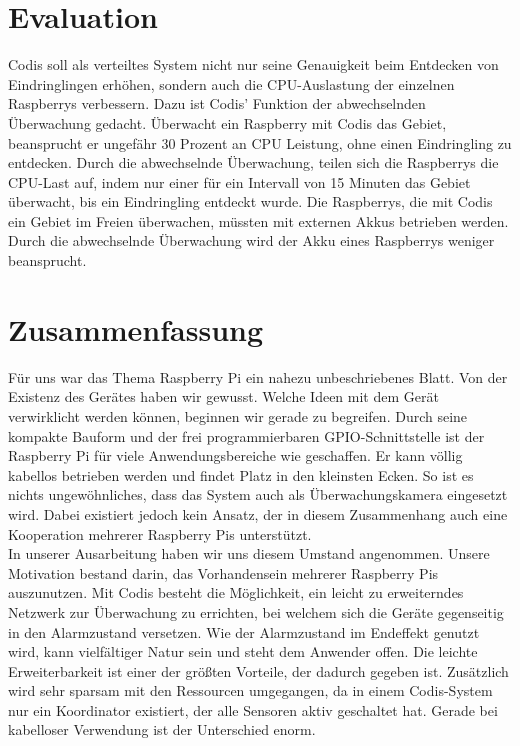 \documentclass[journal]{IEEEtran}
\begin{document}
\section{Evaluation}

Codis soll als verteiltes System nicht nur seine Genauigkeit beim Entdecken von Eindringlingen erhöhen, sondern auch die CPU-Auslastung der einzelnen Raspberrys verbessern. Dazu ist Codis' Funktion der abwechselnden Überwachung gedacht. Überwacht ein Raspberry mit Codis das Gebiet, beansprucht er ungefähr 30 Prozent an CPU Leistung, ohne einen Eindringling zu entdecken. Durch die abwechselnde Überwachung, teilen sich die Raspberrys die CPU-Last auf, indem nur einer für ein Intervall von 15 Minuten das Gebiet überwacht, bis ein Eindringling entdeckt wurde. Die Raspberrys, die mit Codis ein Gebiet im Freien überwachen, müssten mit externen Akkus betrieben werden. Durch die abwechselnde Überwachung wird der Akku eines Raspberrys weniger beansprucht.

\section{Zusammenfassung}
Für uns war das Thema Raspberry Pi ein nahezu unbeschriebenes Blatt. Von der Existenz des Gerätes haben wir gewusst. Welche Ideen mit dem Gerät verwirklicht werden können, beginnen wir gerade zu begreifen. Durch seine kompakte Bauform und der frei programmierbaren GPIO-Schnittstelle ist der Raspberry Pi für viele Anwendungsbereiche wie geschaffen. Er kann völlig kabellos betrieben werden und findet Platz in den kleinsten Ecken. So ist es nichts ungewöhnliches, dass das System auch als Überwachungskamera eingesetzt wird. Dabei existiert jedoch kein Ansatz, der in diesem Zusammenhang auch eine Kooperation mehrerer Raspberry Pis unterstützt. \\In unserer Ausarbeitung haben wir uns diesem Umstand angenommen. Unsere Motivation bestand darin, das Vorhandensein mehrerer Raspberry Pis auszunutzen. Mit Codis besteht die Möglichkeit, ein leicht zu erweiterndes Netzwerk zur Überwachung zu errichten, bei welchem sich die Geräte gegenseitig in den Alarmzustand versetzen. Wie der Alarmzustand im Endeffekt genutzt wird, kann vielfältiger Natur sein und steht dem Anwender offen. Die leichte Erweiterbarkeit ist einer der größten Vorteile, der dadurch gegeben ist. Zusätzlich wird sehr sparsam mit den Ressourcen umgegangen, da in einem Codis-System nur ein Koordinator existiert, der alle Sensoren aktiv geschaltet hat. Gerade bei kabelloser Verwendung ist der Unterschied enorm. 



\printbibliography
\end{document}
